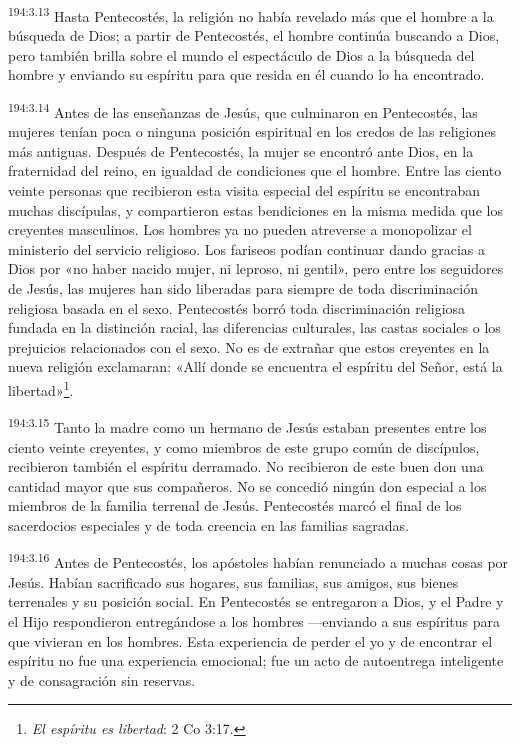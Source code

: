 \par
\textsuperscript{194:3.13} Hasta Pentecostés, la religión no había revelado más que el hombre a la búsqueda de Dios; a partir de Pentecostés, el hombre continúa buscando a Dios, pero también brilla sobre el mundo el espectáculo de Dios a la búsqueda del hombre y enviando su espíritu para que resida en él cuando lo ha encontrado.

\par
\textsuperscript{194:3.14} Antes de las enseñanzas de Jesús, que culminaron en Pentecostés, las mujeres tenían poca o ninguna posición espiritual en los credos de las religiones más antiguas. Después de Pentecostés, la mujer se encontró ante Dios, en la fraternidad del reino, en igualdad de condiciones que el hombre. Entre las ciento veinte personas que recibieron esta visita especial del espíritu se encontraban muchas discípulas, y compartieron estas bendiciones en la misma medida que los creyentes masculinos. Los hombres ya no pueden atreverse a monopolizar el ministerio del servicio religioso. Los fariseos podían continuar dando gracias a Dios por «no haber nacido mujer, ni leproso, ni gentil», pero entre los seguidores de Jesús, las mujeres han sido liberadas para siempre de toda discriminación religiosa basada en el sexo. Pentecostés borró toda discriminación religiosa fundada en la distinción racial, las diferencias culturales, las castas sociales o los prejuicios relacionados con el sexo. No es de extrañar que estos creyentes en la nueva religión exclamaran: «Allí donde se encuentra el espíritu del Señor, está la libertad»\footnote{\textit{El espíritu es libertad}: 2 Co 3:17.}.

\par
\textsuperscript{194:3.15} Tanto la madre como un hermano de Jesús estaban presentes entre los ciento veinte creyentes, y como miembros de este grupo común de discípulos, recibieron también el espíritu derramado. No recibieron de este buen don una cantidad mayor que sus compañeros. No se concedió ningún don especial a los miembros de la familia terrenal de Jesús. Pentecostés marcó el final de los sacerdocios especiales y de toda creencia en las familias sagradas.

\par
\textsuperscript{194:3.16} Antes de Pentecostés, los apóstoles habían renunciado a muchas cosas por Jesús. Habían sacrificado sus hogares, sus familias, sus amigos, sus bienes terrenales y su posición social. En Pentecostés se entregaron a Dios, y el Padre y el Hijo respondieron entregándose a los hombres ---enviando a sus espíritus para que vivieran en los hombres. Esta experiencia de perder el yo y de encontrar el espíritu no fue una experiencia emocional; fue un acto de autoentrega inteligente y de consagración sin reservas.

